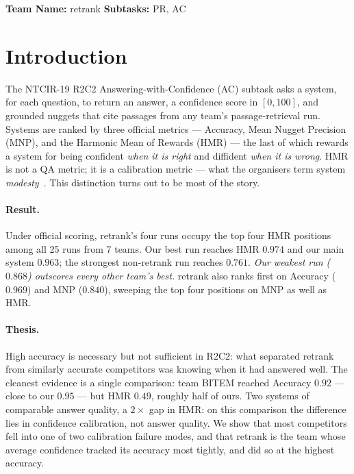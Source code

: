\documentclass[sigconf,nonacm]{acmart}
\newcommand{\HMR}{\textsc{HMR}}
\newcommand{\MNP}{\textsc{MNP}}
\begin{document}

\maketitle

\noindent\textbf{Team Name:} retrank \quad\textbf{Subtasks:} PR, AC

\section{Introduction}
The NTCIR-19 R2C2 Answering-with-Confidence (AC) subtask asks a system, for each
question, to return an answer, a confidence score in $[0,100]$, and grounded nuggets that
cite passages from any team's passage-retrieval run. Systems are ranked by three official
metrics --- Accuracy, Mean Nugget Precision (\MNP), and the Harmonic Mean of Rewards
(\HMR) --- the last of which rewards a system for being confident \emph{when it is right}
and diffident \emph{when it is wrong}. \HMR{} is not a QA metric; it is a calibration
metric --- what the organisers term system \emph{modesty}~\cite{modesty,brevrag}. This
distinction turns out to be most of the story.

\paragraph{Result.} Under official scoring, retrank's four runs occupy the top four \HMR{}
positions among all 25 runs from 7 teams. Our best run reaches \HMR{} $0.974$ and our main
system $0.963$; the strongest non-retrank run reaches $0.761$. \emph{Our weakest run
($0.868$) outscores every other team's best.} retrank also ranks first on Accuracy
($0.969$) and \MNP{} ($0.840$), sweeping the top four positions on \MNP{} as well as \HMR.

\paragraph{Thesis.} High accuracy is necessary but not sufficient in R2C2: what separated
retrank from similarly accurate competitors was knowing when it had answered well. The cleanest evidence is a single comparison: team BITEM reached
Accuracy $0.92$ --- close to our $0.95$ --- but \HMR{} $0.49$, roughly half of ours. Two
systems of comparable answer quality, a $2\times$ gap in \HMR: on this comparison the
difference lies in confidence calibration, not answer quality. We show that most competitors fell into one of two calibration
failure modes, and that retrank is the team whose average confidence tracked its
accuracy most tightly, and did so at the highest accuracy.
\end{document}

